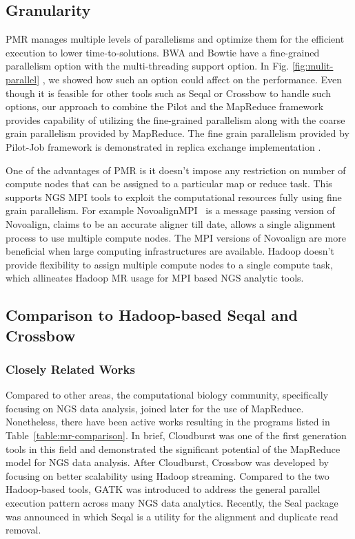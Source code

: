\documentclass{acm_proc_article-sp}
\begin{document}
\subsection{Granularity} 
PMR manages multiple levels of parallelisms and optimize them for the efficient execution to lower time-to-solutions. BWA and Bowtie have a fine-grained parallelism option with the multi-threading support option.   In Fig. \ref{fig:mulit-parallel}  , we showed how such an option could affect on the performance.  
Even though it is feasible for other tools such as Seqal or Crossbow to handle such options, our approach to combine the Pilot and the MapReduce framework provides capability of utilizing the fine-grained parallelism along with the coarse grain parallelism provided by MapReduce. The fine grain parallelism provided by Pilot-Job framework is demonstrated in replica exchange implementation \cite{repex_ptrsa}.  

One of the advantages of PMR is it doesn't impose any restriction on number of compute nodes that can be assigned to a particular map or reduce task. This supports NGS MPI tools to exploit the  computational resources fully using fine grain parallelism. For example NovoalignMPI~\cite{novo-align} is a message passing version of Novoalign, claims to be an accurate aligner till date,  allows a single alignment process to use multiple compute nodes. The MPI versions of Novoalign are more beneficial when large computing infrastructures are available. Hadoop doesn't provide flexibility to assign multiple compute nodes to a single compute task, which allineates Hadoop MR usage for MPI based NGS analytic tools.

\subsection{Comparison to Hadoop-based Seqal and Crossbow}
\subsubsection{Closely Related Works}
Compared to other areas, the computational biology community, specifically focusing on NGS data analysis, joined later for the use of MapReduce\cite{cloudburst}.  Nonetheless, there have been active works resulting in the programs listed in Table~\ref{table:mr-comparison}.  In brief, Cloudburst was one of the first generation tools in this field and  demonstrated the significant potential of the MapReduce model for NGS data analysis.  After Cloudburst, Crossbow was developed by focusing on better scalability using Hadoop streaming.  Compared to the two Hadoop-based tools, GATK was introduced to address the general parallel execution pattern across many NGS data analytics.  Recently, the Seal package was announced in which Seqal is a utility for the alignment and duplicate read removal.   
\end{document}
